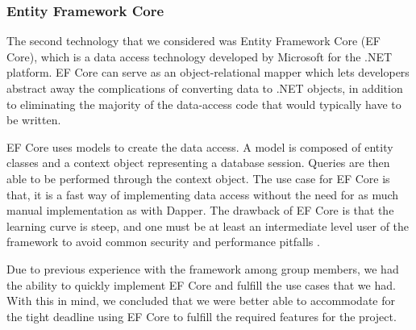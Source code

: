 \subsubsection{Entity Framework Core}
The second technology that we considered was Entity Framework Core (EF Core), which is a data access technology developed by Microsoft for the .NET platform. EF Core can serve as an object-relational mapper \cite{Object_relational_mapping} which lets developers abstract away the complications of converting data to .NET objects, in addition to eliminating the majority of the data-access code that would typically have to be written.

EF Core uses models to create the data access. A model is composed of entity classes and a context object representing a database session.
Queries are then able to be performed through the context object. 
The use case for EF Core is that, it is a fast way of implementing data access without the need for as much manual implementation as with Dapper. 
The drawback of EF Core is that the learning curve is steep, and one must be at least an intermediate level user of the framework to avoid common security and performance pitfalls \cite{EFCore}.

Due to previous experience with the framework among group members, we had the ability to quickly implement EF Core and fulfill the use cases that we had.
With this in mind, we concluded that we were better able to accommodate for the tight deadline using EF Core to fulfill the required features for the \knox{} project.
